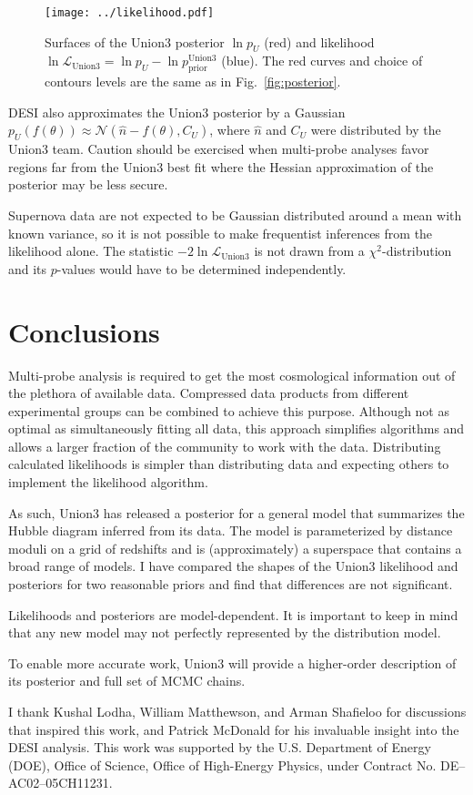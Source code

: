 \documentclass[11pt,a4paper]{article}
\begin{document}
\begin{figure}[htbp] %
   \centering
   \texttt{[image: ../likelihood.pdf]} 
   \caption{Surfaces of the Union3 posterior $\ln{p_U}$ (red) and likelihood $\ln{\mathcal{L}_\text{Union3}}  = \ln{p_U}-\ln{p_\text{prior}^\text{Union3}}$ (blue).   The red curves
   and choice of contours levels are the same as in Fig.~\ref{fig:posterior}.\label{fig:likelihood}}
\end{figure}

DESI also approximates the Union3 posterior by a Gaussian ${p_U(f(\theta))} \approx \mathcal{N}( \hat{n}-f(\theta) , C_U)$,
where $\hat{n}$ and $C_U$ were distributed by the Union3 team.
Caution should be exercised when multi-probe analyses favor regions far from the Union3 best fit  where the Hessian approximation of the
posterior may be less secure.

Supernova data are not expected to be Gaussian distributed around a mean with known variance, so it is not possible
to make frequentist inferences from the likelihood alone.  The statistic
$-2\ln{\mathcal{L}_\text{Union3}}$  is not drawn from a $\chi^2$-distribution and its $p$-values would have to be determined
independently.

\section{Conclusions}
\label{sec:conclusions}
Multi-probe  analysis is required to get the most cosmological information out of the plethora of available data. 
Compressed data products from different experimental groups can be combined to achieve this purpose.
Although not as optimal as simultaneously fitting all data, this approach simplifies algorithms and allows a larger
fraction of
the community to work with the data.  Distributing calculated likelihoods is simpler than distributing data and expecting others to implement the likelihood algorithm.

As such, Union3 has released a posterior for a general model that summarizes the Hubble diagram inferred from its data.
The model is parameterized by distance moduli on a grid of redshifts and is (approximately) a superspace that
contains a broad range of models.    I have compared the shapes of the Union3 likelihood and posteriors for two
reasonable priors and find that differences are not significant.

Likelihoods and posteriors are model-dependent.  It is important to keep in mind that any new model may not perfectly represented by the 
distribution model.

To enable more accurate work, Union3 will provide a higher-order description of its posterior and full set of MCMC chains.

\acknowledgments
I thank Kushal Lodha, William Matthewson, and Arman Shafieloo for discussions that inspired this work, 
and Patrick McDonald for his invaluable insight into the DESI analysis.
This work was supported by the U.S. Department of Energy (DOE), Office
of Science, Office of High-Energy Physics, under Contract No. DE–AC02–05CH11231.


\end{document}
